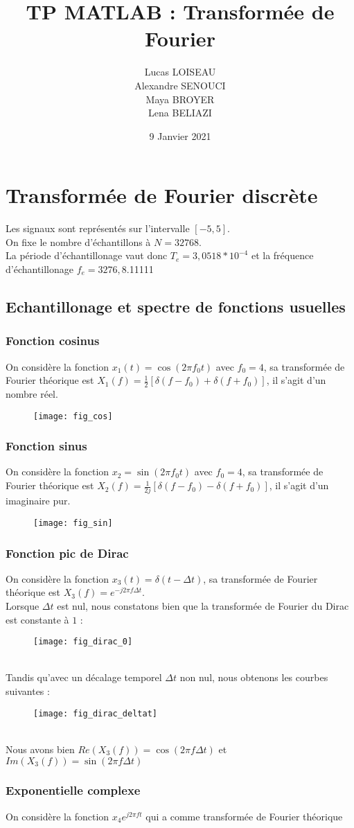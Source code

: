\documentclass{article}
\title{TP MATLAB : Transformée de Fourier}
\date{9 Janvier 2021}
\author{Lucas LOISEAU \\ Alexandre SENOUCI \\ Maya BROYER \\ Lena BELIAZI}
\begin{document}
\maketitle
\section{Transformée de Fourier discrète}
Les signaux sont représentés sur l'intervalle $[-5,5]$. \\
On fixe le nombre d'échantillons à $N=32768$. \\
La période d'échantillonage vaut donc $T_e = 3,0518 * 10^{-4}$ et la fréquence d'échantillonage $f_e=3276,8$.11111
\subsection{Echantillonage et spectre de fonctions usuelles}
\subsubsection{Fonction cosinus}
On considère la fonction $x_1(t)=\cos(2\pi f_0 t)$ avec $f_0=4$, sa transformée de Fourier théorique est $X_1(f)=\frac{1}{2}[\delta(f-f_0)+\delta(f+f_0)]$, il s'agit d'un nombre réel.
\begin{figure}[h]
\texttt{[image: fig\_cos]}
\centering
\end{figure}

\subsubsection{Fonction sinus}
On considère la fonction $x_2=\sin(2\pi f_0 t)$ avec $f_0=4$, sa transformée de Fourier théorique est $X_2(f)=\frac{1}{2j}[\delta(f-f_0)-\delta(f+f_0)]$, il s'agit d'un imaginaire pur.
\begin{figure}[h]
\texttt{[image: fig\_sin]}
\centering
\end{figure}

\subsubsection{Fonction pic de Dirac}
On considère la fonction $x_3(t)=\delta(t-\Delta t)$, sa transformée de Fourier théorique est $X_3(f)=e^{-j2\pi f\Delta t}$. \\
Lorsque $\Delta t$ est nul, nous constatons bien que la transformée de Fourier du Dirac est constante à $1$ :
\begin{figure}[h]
\texttt{[image: fig\_dirac\_0]}
\centering
\end{figure} \\
Tandis qu'avec un décalage temporel $\Delta t$ non nul, nous obtenons les courbes suivantes :
\begin{figure}[h]
\texttt{[image: fig\_dirac\_deltat]}
\centering
\end{figure} \\
Nous avons bien $Re(X_3(f))=\cos(2\pi f\Delta t)$ et $Im(X_3(f))=\sin(2\pi f\Delta t)$

\subsubsection{Exponentielle complexe}
On considère la fonction $x_4e^{j2\pi f t}$ qui a comme transformée de Fourier théorique
\end{document}
